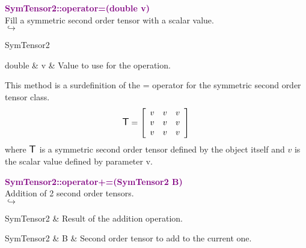 \textcolor{purple}{\textbf{SymTensor2::operator=(double v)}}\label{SymTensor2::operator=(double v)}\\
Fill a symmetric second order tensor with a scalar value.\\ \hspace*{5mm}$\hookrightarrow$
\vspace*{-2em}\begin{tcolorbox}[grow to left by=-1cm, width=\textwidth-1cm,myArgs,tabularx={l|R}]
SymTensor2
\end{tcolorbox}

\begin{tcolorbox}[width=\textwidth,myArgs,tabularx={ll|R}]
double & v & Value to use for the operation.
\end{tcolorbox}

This method is a surdefinition of the = operator for the symmetric second order tensor class.
\begin{equation*}
\mbox{\large\ensuremath{\mathsf{T}}}=\left[\begin{array}{ccc}
v & v & v\\
v & v & v\\
v & v & v
\end{array}\right]
\end{equation*}
where $\mbox{\large\ensuremath{\mathsf{T}}}$ is a symmetric second order tensor defined by the object itself and $v$ is the scalar value defined by parameter v.

\textcolor{purple}{\textbf{SymTensor2::operator+=(SymTensor2 B)}}\label{SymTensor2::operator+=(SymTensor2 B)}\\
Addition of 2 second order tensors.\\ \hspace*{5mm}$\hookrightarrow$
\vspace*{-2em}\begin{tcolorbox}[grow to left by=-1cm, width=\textwidth-1cm,myArgs,tabularx={l|R}]
SymTensor2 & Result of the addition operation.
\end{tcolorbox}

\begin{tcolorbox}[width=\textwidth,myArgs,tabularx={ll|R}]
SymTensor2 & B & Second order tensor to add to the current one.
\end{tcolorbox}

